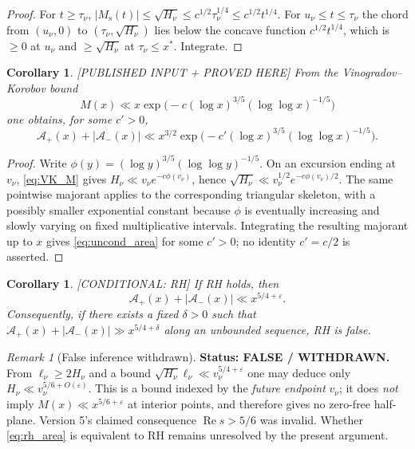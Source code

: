 \documentclass[11pt]{amsart}
\numberwithin{equation}{section}
\theoremstyle{plain}
\newtheorem{corollary}[theorem]{Corollary}
\theoremstyle{definition}
\theoremstyle{remark}
\newtheorem{remark}[theorem]{Remark}
\newcommand{\Ms}{M_{\mathrm{s}}}
\newcommand{\Ap}{\mathcal{A}_{+}}
\newcommand{\Am}{\mathcal{A}_{-}}
\newcommand{\eps}{\varepsilon}
\begin{document}
\begin{proof}
For $t\ge\tau_\nu$, $|\Ms(t)|\le\sqrt{H_\nu}\le c^{1/2}\tau_\nu^{1/4}\le
c^{1/2}t^{1/4}$. For $u_\nu\le t\le\tau_\nu$ the chord from $(u_\nu,0)$ to
$(\tau_\nu,\sqrt{H_\nu})$ lies below the concave function $c^{1/2}t^{1/4}$,
which is $\ge0$ at $u_\nu$ and $\ge\sqrt{H_\nu}$ at $\tau_\nu\le x^*$.
Integrate.
\end{proof}

\begin{corollary}
\label{cor:uncond}
\emph{[PUBLISHED INPUT + PROVED HERE]} From the Vinogradov--Korobov bound
\cite{Walfisz1963}
\begin{equation}
\label{eq:VK_M}
  M(x)\ll x\exp\bigl(-c(\log x)^{3/5}(\log\log x)^{-1/5}\bigr)
\end{equation}
one obtains, for some $c'>0$,
\begin{equation}
\label{eq:uncond_area}
  \Ap(x)+|\Am(x)|\ll x^{3/2}\exp\bigl(-c'(\log x)^{3/5}(\log\log x)^{-1/5}\bigr).
\end{equation}
\end{corollary}

\begin{proof}
Write $\phi(y)=(\log y)^{3/5}(\log\log y)^{-1/5}$.  On an excursion ending
at $v_\nu$, \eqref{eq:VK_M} gives
$H_\nu\ll v_\nu e^{-c\phi(v_\nu)}$, hence
$\sqrt{H_\nu}\ll v_\nu^{1/2}e^{-c\phi(v_\nu)/2}$.  The same pointwise
majorant applies to the corresponding triangular skeleton, with a possibly
smaller exponential constant because $\phi$ is eventually increasing and
slowly varying on fixed multiplicative intervals.  Integrating the resulting
majorant up to $x$ gives \eqref{eq:uncond_area} for some $c'>0$; no identity
$c'=c/2$ is asserted.
\end{proof}

\begin{corollary}
\label{cor:rh}
\emph{[CONDITIONAL: RH]} If RH holds, then
\begin{equation}
\label{eq:rh_area}
  \Ap(x)+|\Am(x)|\ll x^{5/4+\eps}.
\end{equation}
Consequently, if there exists a fixed $\delta>0$ such that
$\Ap(x)+|\Am(x)|\gg x^{5/4+\delta}$ along an unbounded sequence, RH is
false.
\end{corollary}

\begin{remark}[False inference withdrawn]
\label{rem:onedirection}
\textbf{Status: FALSE / WITHDRAWN.} From $\ell_\nu\ge2H_\nu$ and a bound
$\sqrt{H_\nu}\ell_\nu\ll v_\nu^{5/4+\eps}$ one may deduce only
$H_\nu\ll v_\nu^{5/6+O(\eps)}$. This is a bound indexed by the
\emph{future endpoint} $v_\nu$; it does \emph{not} imply
$M(x)\ll x^{5/6+\eps}$ at interior points, and therefore gives no
zero-free half-plane. Version 5's claimed consequence
$\operatorname{Re}s>5/6$ was invalid. Whether \eqref{eq:rh_area} is
equivalent to RH remains unresolved by the present argument.
\end{remark}
\end{document}
